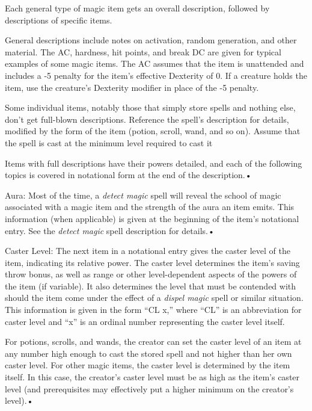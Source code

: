 \documentclass{article}
\begin{document}
Each general type of magic item gets an overall description, followed by descriptions 
of specific items.

General descriptions include notes on activation, random generation, and other 
material. The AC, hardness, hit points, and break DC are given for typical examples 
of some magic items. The AC assumes that the item is unattended and includes a 
-5 penalty for the item's effective Dexterity of 0. If a creature holds the item, 
use the creature's Dexterity modifier in place of the -5 penalty.

Some individual items, notably those that simply store spells and nothing else, 
don't get full-blown descriptions. Reference the spell's description for details, 
modified by the form of the item (potion, scroll, wand, and so on). Assume that 
the spell is cast at the minimum level required to cast it

Items with full descriptions have their powers detailed, and each of the following 
topics is covered in notational form at the end of the description.• 

\parindent=3pt
Aura: Most of the time, a \textit{detect magic }spell will reveal the school of 
magic associated with a magic item and the strength of the aura an item emits. 
This information (when applicable) is given at the beginning of the item's notational 
entry. See the \textit{detect magic }spell description\textit{ }for details.• 

\parindent=0pt
Caster Level: The next item in a notational entry gives the caster level of the 
item, indicating its relative power. The caster level determines the item's saving 
throw bonus, as well as range or other level-dependent aspects of the powers of 
the item (if variable). It also determines the level that must be contended with 
should the item come under the effect of a \textit{dispel magic }spell or similar 
situation. This information is given in the form ``CL x,'' where ``CL'' is an abbreviation 
for caster level and ``x'' is an ordinal number representing the caster level itself.

For potions, scrolls, and wands, the creator can set the caster level of an item 
at any number high enough to cast the stored spell and not higher than her own 
caster level. For other magic items, the caster level is determined by the item 
itself. In this case, the creator's caster level must be as high as the item's 
caster level (and prerequisites may effectively put a higher minimum on the creator's 
level).• 
\end{document}
